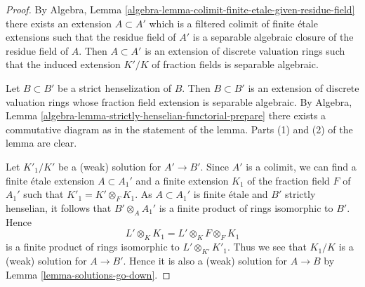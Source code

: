 \documentclass[10pt,a4paper]{amsart}
\theoremstyle{plain}
\theoremstyle{definition}
\theoremstyle{remark}
\numberwithin{equation}{subsection}
\begin{document}
\begin{proof}
By Algebra, Lemma \ref{algebra-lemma-colimit-finite-etale-given-residue-field}
there exists an extension $A \subset A'$ which is a filtered colimit of finite
\'etale extensions such that the residue field of $A'$ is a separable algebraic
closure of the residue field of $A$. Then $A \subset A'$ is an extension of
discrete valuation rings such that the induced extension $K'/K$ of
fraction fields is separable algebraic.

\medskip\noindent
Let $B \subset B'$ be a strict henselization of $B$. Then $B \subset B'$ is an
extension of discrete valuation rings whose fraction field extension is
separable algebraic. By
Algebra, Lemma \ref{algebra-lemma-strictly-henselian-functorial-prepare}
there exists a commutative diagram as in the statement of the lemma.
Parts (1) and (2) of the lemma are clear.

\medskip\noindent
Let $K'_1/K'$ be a (weak) solution for $A' \to B'$. Since $A'$ is a
colimit, we can find a finite \'etale extension $A \subset A_1'$ and a finite
extension $K_1$ of the fraction field $F$ of $A_1'$ such that
$K'_1 = K' \otimes_F K_1$. As $A \subset A_1'$ is finite \'etale
and $B'$ strictly henselian, it follows that $B' \otimes_A A_1'$ is a finite
product of rings isomorphic to $B'$. Hence
$$
L' \otimes_K K_1 = L' \otimes_K F \otimes_F K_1
$$
is a finite product of rings isomorphic to $L' \otimes_{K'} K'_1$.
Thus we see that $K_1/K$ is a (weak) solution for $A \to B'$.
Hence it is also a (weak) solution for $A \to B$ by
Lemma \ref{lemma-solutions-go-down}.
\end{proof}
\end{document}
